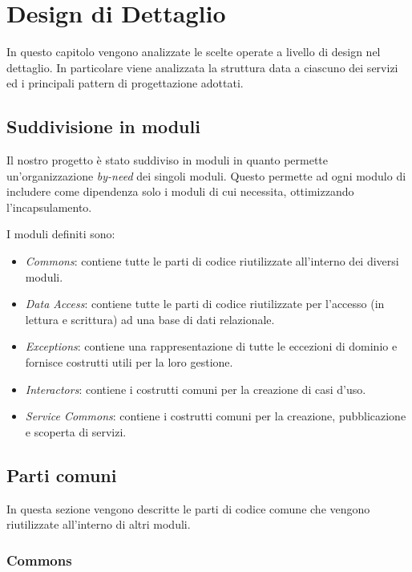 \chapter{Design di Dettaglio}

In questo capitolo vengono analizzate le scelte operate a livello di design nel dettaglio. In particolare viene analizzata la struttura data a ciascuno dei servizi ed i principali pattern di progettazione adottati.

\section{Suddivisione in moduli}

Il nostro progetto è stato suddiviso in moduli in quanto permette un'organizzazione \textit{by-need} dei singoli moduli. Questo permette ad ogni modulo di includere come dipendenza solo i moduli di cui necessita, ottimizzando l'incapsulamento.

I moduli definiti sono:

\begin{itemize}
%
    \item \textit{Commons}: contiene tutte le parti di codice riutilizzate all'interno dei diversi moduli.
%
    \item \textit{Data Access}: contiene tutte le parti di codice riutilizzate per l'accesso (in lettura e scrittura) ad una base di dati relazionale.
%
    \item \textit{Exceptions}: contiene una rappresentazione di tutte le eccezioni di dominio e fornisce costrutti utili per la loro gestione.
%
    \item \textit{Interactors}:  contiene i costrutti comuni per la creazione di casi d'uso.
%
    \item \textit{Service Commons}: contiene i costrutti comuni per la creazione, pubblicazione e scoperta di servizi.
%
\end{itemize}

\section{Parti comuni}

In questa sezione vengono descritte le parti di codice comune che vengono riutilizzate all'interno di altri moduli.

\subsection{Commons}

